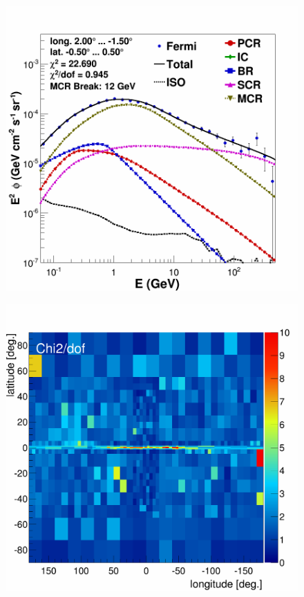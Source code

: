 \begin{figure}[h]
\begin{minipage}[h]{0.45\textwidth}
	\includegraphics[width=\linewidth]{pic/results/MCRonly_CMZ.png}
  	\label{fig:MCRonly_CMZ}
  \end{minipage}
  \hfill
  \begin{minipage}[h]{0.45\textwidth}
  	\centering
	\includegraphics[width=1\linewidth]{pic/results/DMonly_chi2Distribution.png}

\end{minipage}
\end{figure}
